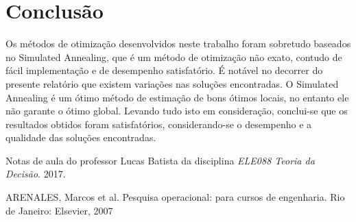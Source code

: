 \documentclass[conference]{IEEEtran}
\begin{document}
\section{Conclusão}
Os métodos de otimização desenvolvidos neste trabalho foram sobretudo baseados no Simulated Annealing, que é um método de otimização não exato, contudo de fácil implementação e de desempenho satisfatório. É notável no decorrer do presente relatório que existem variações nas soluções encontradas. O Simulated Annealing é um ótimo método de estimação
de bons ótimos locais, no entanto ele não garante o ótimo global. Levando tudo isto em consideração, conclui-se que os resultados obtidos foram satisfatórios, considerando-se o desempenho e a qualidade das soluções encontradas.

\begin{thebibliography}{1}

Notas de aula do professor Lucas Batista da disciplina \emph{ELE088 Teoria da Decisão}. 2017.

ARENALES, Marcos et al. Pesquisa operacional: para cursos de engenharia. Rio de Janeiro: Elsevier, 2007

\end{thebibliography}


\end{document}
